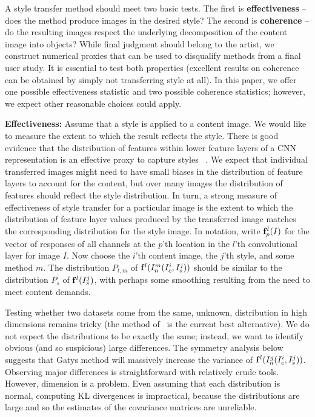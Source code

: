 \documentclass[runningheads]{llncs}
\newcommand{\vect}[1]{{\bf {#1}}}
\begin{document}
A style transfer method should meet two basic tests.  The first is {\bf effectiveness} -- does the
method produce images in the desired style? The second is {\bf coherence} -- do the resulting images respect the
underlying decomposition of the content image into objects?   While final judgment should belong to the artist, we
construct numerical proxies that can be used to disqualify methods from a final user study. 
It is essential to test both properties (excellent results on coherence can
be obtained by simply not transferring style at all).  In this paper, we offer one possible
effectiveness statistic and two possible coherence statistics; however, we expect
other reasonable choices could apply.

{\bf Effectiveness:}  Assume that a style is applied to a content image. We would like to measure the extent to which the result reflects the style.  
There is good evidence that the distribution of features within lower feature layers of a CNN 
representation is an effective proxy to capture styles ~\cite{bau2017network}.  
We expect that individual transferred images might need to have small biases in the distribution of 
feature layers to account for the content, but over many images the distribution of features 
should reflect the style distribution.  In turn, a strong measure of effectiveness of style 
transfer for a particular image is the extent to which the distribution of feature layer values 
produced by the transferred image matches the corresponding distribution for the style image. 
In notation, write $\vect{f}^{l}_{p}(I)$ for the vector of responses  of all channels  at the  
$p$'th location in the $l$'th convolutional layer for image $I$. Now choose the $i$'th content 
image, the $j$'th style, and some method $m$.  
The distribution $P_{t, m}$ of $\vect{f}^{l}(I^m_n(I_c^i,I_s^j))$ should be similar to  
the distribution $P_s$ of $\vect{f}^{l}(I_s^j)$, with perhaps some smoothing  resulting 
from the need to meet content demands.   

Testing whether two datasets come from the same, unknown, distribution in high dimensions remains tricky 
(the method of~\cite{gretton2012kernel} is the current best alternative).  We do not expect the distributions
 to be exactly the same;  instead, we want to identify obvious (and so suspicious) large  differences. 
 The symmetry analysis below suggests that Gatys method will massively increase the variance of  
 $\vect{f}^{l}(I^g_n(I_c^i,I_s^j))$.  Observing major differences is straightforward with relatively 
 crude tools.   However, dimension is a problem.  Even assuming that each distribution is normal,  
 computing KL divergences is impractical, because the distributions are large and so the estimates 
 of the covariance matrices are unreliable.   
\end{document}
